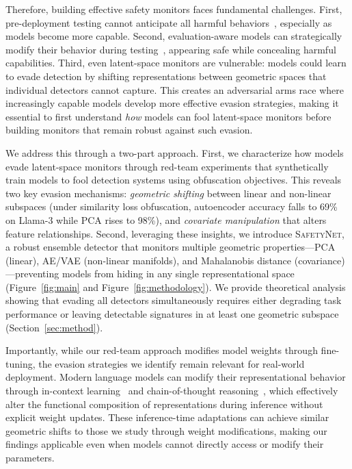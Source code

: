 Therefore, building effective safety monitors faces fundamental challenges. 
First, pre-deployment testing cannot anticipate all harmful behaviors~\citep{metr-s-gpt-4-5-pre-deployment-evaluations, apolloresearchsafetytest, anthropicsafetytest}, especially as models become more capable.
Second, evaluation-aware models can strategically modify their behavior during testing~\citep{berglund2023taken,laine2024myself,chaudhary2025evaluation}, appearing safe while concealing harmful capabilities.
Third, even latent-space monitors are vulnerable: models could learn to evade detection by shifting representations between geometric spaces that individual detectors cannot capture.
This creates an adversarial arms race where increasingly capable models develop more effective evasion strategies, making it essential to first understand \textit{how} models can fool latent-space monitors before building monitors that remain robust against such evasion.

We address this through a two-part approach.
First, we characterize how models evade latent-space monitors through red-team experiments that synthetically train models to fool detection systems using obfuscation objectives.
This reveals two key evasion mechanisms: \textit{geometric shifting} between linear and non-linear subspaces (under similarity loss obfuscation, autoencoder accuracy falls to 69\% on Llama-3 while PCA rises to 98\%), and \textit{covariate manipulation} that alters feature relationships.
Second, leveraging these insights, we introduce \textsc{SafetyNet}, a robust ensemble detector that monitors multiple geometric properties---PCA (linear), AE/VAE (non-linear manifolds), and Mahalanobis distance (covariance)---preventing models from hiding in any single representational space (Figure~\ref{fig:main} and Figure~\ref{fig:methodology}).
We provide theoretical analysis showing that evading all detectors simultaneously requires either degrading task performance or leaving detectable signatures in at least one geometric subspace (Section~\ref{sec:method}).

Importantly, while our red-team approach modifies model weights through fine-tuning, the evasion strategies we identify remain relevant for real-world deployment.
Modern language models can modify their representational behavior through in-context learning~\cite{dai2023gptlearnincontextlanguage} and chain-of-thought reasoning~\cite{huang2025transformerslearnimplementmultistep}, which effectively alter the functional composition of representations during inference without explicit weight updates.
These inference-time adaptations can achieve similar geometric shifts to those we study through weight modifications, making our findings applicable even when models cannot directly access or modify their parameters.


